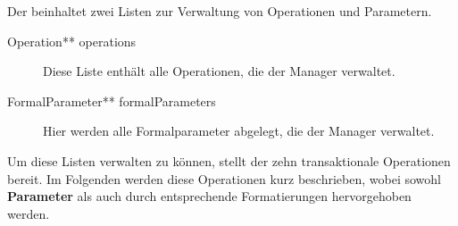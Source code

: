 Der  beinhaltet zwei Listen zur Verwaltung von Operationen und Parametern.

\begin{description}
\item[Operation** operations] Diese Liste enthält alle Operationen, die der Manager verwaltet.
\item[FormalParameter** formalParameters] Hier werden alle Formalparameter abgelegt, die der Manager verwaltet.
\end{description}

Um diese Listen verwalten zu können, stellt der  zehn transaktionale Operationen bereit.
Im Folgenden werden diese Operationen kurz beschrieben, wobei sowohl \textbf{Parameter} als auch  durch entsprechende Formatierungen hervorgehoben werden.

